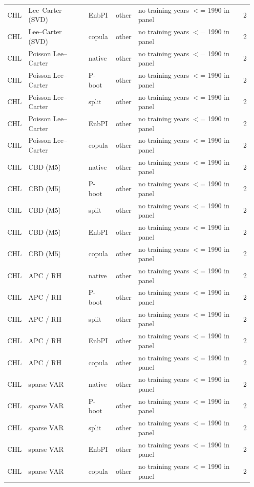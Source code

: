 {\begin{longtable}{@{}lllp{1.6cm}p{6.2cm}r@{}}
CHL & Lee--Carter (SVD) & EnbPI & other & no training years $<$= 1990 in panel & 2 \\
CHL & Lee--Carter (SVD) & copula & other & no training years $<$= 1990 in panel & 2 \\
CHL & Poisson Lee--Carter & native & other & no training years $<$= 1990 in panel & 2 \\
CHL & Poisson Lee--Carter & P-boot & other & no training years $<$= 1990 in panel & 2 \\
CHL & Poisson Lee--Carter & split & other & no training years $<$= 1990 in panel & 2 \\
CHL & Poisson Lee--Carter & EnbPI & other & no training years $<$= 1990 in panel & 2 \\
CHL & Poisson Lee--Carter & copula & other & no training years $<$= 1990 in panel & 2 \\
CHL & CBD (M5) & native & other & no training years $<$= 1990 in panel & 2 \\
CHL & CBD (M5) & P-boot & other & no training years $<$= 1990 in panel & 2 \\
CHL & CBD (M5) & split & other & no training years $<$= 1990 in panel & 2 \\
CHL & CBD (M5) & EnbPI & other & no training years $<$= 1990 in panel & 2 \\
CHL & CBD (M5) & copula & other & no training years $<$= 1990 in panel & 2 \\
CHL & APC / RH & native & other & no training years $<$= 1990 in panel & 2 \\
CHL & APC / RH & P-boot & other & no training years $<$= 1990 in panel & 2 \\
CHL & APC / RH & split & other & no training years $<$= 1990 in panel & 2 \\
CHL & APC / RH & EnbPI & other & no training years $<$= 1990 in panel & 2 \\
CHL & APC / RH & copula & other & no training years $<$= 1990 in panel & 2 \\
CHL & sparse VAR & native & other & no training years $<$= 1990 in panel & 2 \\
CHL & sparse VAR & P-boot & other & no training years $<$= 1990 in panel & 2 \\
CHL & sparse VAR & split & other & no training years $<$= 1990 in panel & 2 \\
CHL & sparse VAR & EnbPI & other & no training years $<$= 1990 in panel & 2 \\
CHL & sparse VAR & copula & other & no training years $<$= 1990 in panel & 2 \\

\end{longtable}}
